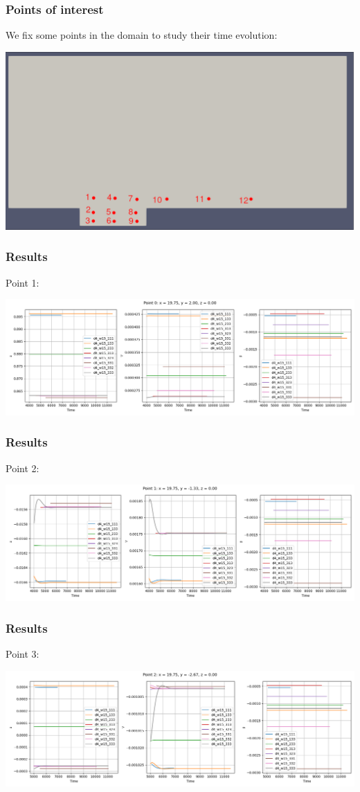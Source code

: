 \documentclass[
	aspectratio=169, %
	t, %
	onlytextwidth, %
	10pt, %
]{beamer}
\begin{document}
\begin{frame}
	\frametitle{Points of interest}

	We fix some points in the domain to study their time evolution:

	\centering
	\includegraphics[width=0.8\linewidth]{Images/points.png}

\end{frame}
\begin{frame}
	\frametitle{Results}
	Point 1:

	\centering
	\includegraphics[width=\linewidth]{Images/point1.png}
\end{frame}
\begin{frame}
	\frametitle{Results}
	Point 2:

	\centering
	\includegraphics[width=\linewidth]{Images/point2.png}
\end{frame}
\begin{frame}
	\frametitle{Results}
	Point 3:

	\centering
	\includegraphics[width=\linewidth]{Images/point3.png}
\end{frame}
\end{document}
